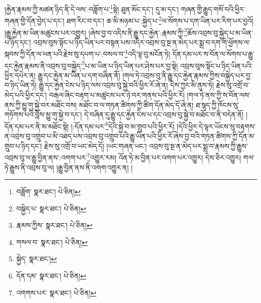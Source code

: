 །རྐྱེན་རྣམས་ཀྱི་མཚན་ཉིད་ནི་དེ་ལས་:བཟློག་པ་\footnote{བཟློག་  སྣར་ཐང་།  པེ་ཅིན། }སྟེ། ཐུན་མོང་དང་། དུ་མ་དང་། གཞན་གྱི་རྒྱུད་གསོ་བའི་ཕྱིར་གཞན་གྱི་དོན་བྱེད་པ་དང་། ཐག་རིང་བ་དང་། ཆ་མི་མཉམ་པ་:སྐྱེད་པ་\footnote{བསྐྱེད་པ་  སྣར་ཐང་།  པེ་ཅིན། }ལ་སོགས་པ་དག་ཡིན་པར་རིག་པར་བྱའོ། །རྒྱུ་རྐྱེན་མ་ཡིན་མཚུངས་པར་འགྱུར། །ཞེས་བྱ་བ་འདིས་ནི་རྒྱུ་དང་རྐྱེན་:རྣམས་ཀྱི་\footnote{རྣམས་ཀྱིས་  སྣར་ཐང་།  པེ་ཅིན། }ཆོས་འབྲས་བུ་སྐྱེད་པ་མ་ཡིན་པ་ཉིད་དང་། འབྲས་བུས་སྟོང་པ་ཉིད་ཡིན་པར་བསྟན་པས་འདིར་འབྲས་བུ་སྔ་ན་མེད་པར་སྨྲ་བ་དག་གི་ཕྱོགས་ལ་སྐབས་ཀྱི་དོན་ལ་ཕན་པའི་རྗེས་སུ་དཔག་པ་:བསལ་བ་\footnote{གསལ་བ་  སྣར་ཐང་།  པེ་ཅིན། }འདི་ལྟ་བུ་མངོན་ཏེ། དོན་དམ་པར་ས་བོན་ལ་སོགས་པ་རྒྱུ་དང་རྐྱེན་རྣམས་ནི་འབྲས་བུ་བསྐྱེད་\footnote{སྐྱེད་  སྣར་ཐང་། }པ་མ་ཡིན་པ་ཉིད་ཡིན་པར་ཤེས་པར་བྱ་སྟེ། འབྲས་བུས་སྟོང་པ་ཉིད་ཡིན་པའི་ཕྱིར་དཔེར་ན། རྒྱུ་དང་རྐྱེན་མ་ཡིན་པ་དག་བཞིན་ནོ། །གལ་ཏེ་འབྲས་བུ་ནི་རྒྱུ་དང་རྐྱེན་རྣམས་ཀྱིས་བསྐྱེད་པར་བྱ་བ་ཉིད་ཡིན་ཏེ། རྒྱུ་དང་རྐྱེན་ངེས་པ་ཉིད་ལས་འབྲས་བུ་སྐྱེ་བའི་ཕྱིར་རོ་ཞེ་ན། དེས་ཀྱང་མི་ནུས་ཏེ། རྗེས་སུ་འགྲོ་བ་མེད་པའི་ཕྱིར་དང་། བརྒལ་ཞིང་བརྟག་པ་མཚུངས་པར་ཉེ་བར་གནས་པའི་ཕྱིར་རོ། །གལ་ཏེ་ནས་ཀྱི་ས་བོན་ལས་ནས་ཀྱི་མྱུ་གུ་སྐྱེ་བར་མཐོང་བས། མཐོང་བ་ལ་གཏན་ཚིགས་ཀྱི་ཚིག་དོན་མེད་དོ་ཞེ་ན། ཐ་སྙད་ཀྱི་ཁོངས་སུ་གཏོགས་པའི་བློས་མྱུ་གུ་སྐྱེ་བ་དང་། དེ་བཞིན་དུ་རྒྱུ་དང་རྐྱེན་ངེས་པ་དང་འབྲས་བུ་སྐྱེ་བ་མཐོང་བ་ནི་བདེན་ནོ། །དོན་དམ་པར་ནི་མ་མཐོང་སྟེ། །:དོན་དམ་པར་\footnote{དོན་དམ་  སྣར་ཐང་།  པེ་ཅིན། }དེའི་སྐྱེ་བ་མ་གྲུབ་པའི་ཕྱིར་རོ། །དེའི་ཕྱིར་དེ་ལྟར་ཡོངས་སུ་བརྟགས་ན་འབྲས་བུ་འགྲུབ་པ་མི་འཐད་པས་འབྲས་བུ་འགྲུབ་པའི་རྒྱུ་ཡིན་པའི་ཕྱིར་རོ་ཞེས་བྱ་བའི་གཏན་ཚིགས་ཀྱི་དོན་མ་གྲུབ་པ་ཉིད་དང་། རྗེས་སུ་འགྲོ་བ་ཡང་མེད་དོ། །ཡང་གཞན་ཡང་། འབྲས་བུ་སྔ་ན་མེད་པར་སྨྲ་བ་རྣམས་ཀྱི་རྒྱུས་འབྲས་བུ་ལ་རྒྱུ་བྱིན་ནས་:འགག་པར་\footnote{འགགས་པར་  སྣར་ཐང་།  པེ་ཅིན། }འགྱུར་རམ། འོན་ཏེ་མ་བྱིན་པར་འགག་པར་འགྱུར། དེས་ཅིར་འགྱུར། གལ་ཏེ་རྒྱུས་ནི་འབྲས་བུ་ལ། །རྒྱུ་བྱིན་ནས་ནི་འགག་འགྱུར་ན། །
